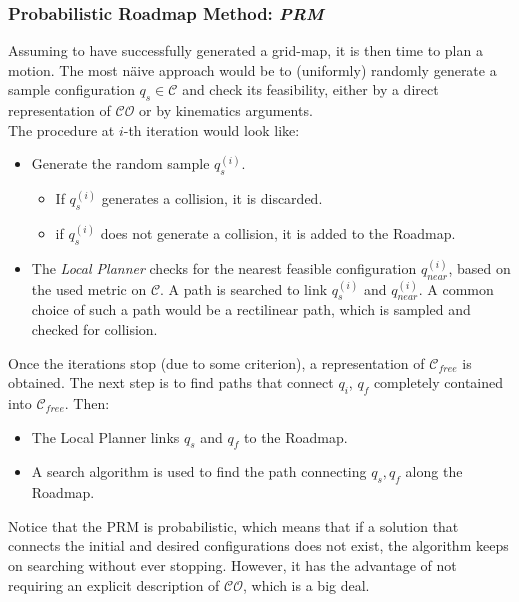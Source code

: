                         \subsubsection{Probabilistic Roadmap Method: \textit{PRM}}
                            Assuming to have successfully generated a grid-map, it is then time to plan a motion. The most n\"{a}ive approach would be to (uniformly) randomly generate a sample configuration $q_s\in \mathcal{C}$ and check its feasibility, either by a direct representation of $\mathcal{CO}$ or by kinematics arguments. \\
                            The procedure at $i$-th iteration would look like:
                            \begin{itemize}
                                \item Generate the random sample $q_s^{(i)}$.
                                \begin{itemize}
                                    \item If $q_s^{(i)}$ generates a collision, it is discarded.
                                    \item if $q_s^{(i)}$ does not generate a collision, it is added to the Roadmap.
                                \end{itemize}
                                \item The \textit{Local Planner} checks for the nearest feasible configuration $q_{near}^{(i)}$, based on the used metric on $\mathcal{C}$. A path is searched to link $q_s^{(i)}$ and $q_{near}^{(i)}$. A common choice of such a path would be a rectilinear path, which is sampled and checked for collision.
                            \end{itemize}
                            Once the iterations stop (due to some criterion), a representation of $\mathcal{C}_{free}$ is obtained. The next step is to find paths that connect $q_i$, $q_f$ completely contained into $\mathcal{C}_{free}$. Then:
                            \begin{itemize}
                                \item The Local Planner links $q_s$ and $q_f$ to the Roadmap.
                                \item A search algorithm is used to find the path connecting $q_s,q_f$ along the Roadmap.
                            \end{itemize}
                            Notice that the PRM is probabilistic, which means that if a solution that connects the initial and desired configurations does not exist, the algorithm keeps on searching without ever stopping. However, it has the advantage of not requiring an explicit description of $\mathcal{CO}$, which is a big deal. 
